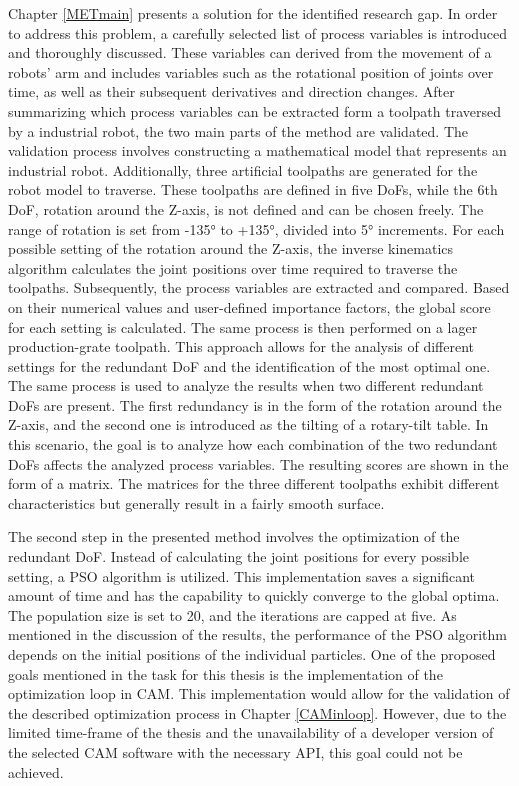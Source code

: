 Chapter \ref{METmain} presents a solution for the identified research gap. In order to address this problem, a carefully selected list of process variables is introduced and thoroughly discussed. These variables can derived from the movement of a robots' arm and includes variables such as the rotational position of joints over time, as well as their subsequent derivatives and direction changes.
After summarizing which process variables can be extracted form a toolpath traversed by a industrial robot, the two main parts of the method are validated. 
The validation process involves constructing a mathematical model that represents an industrial robot. Additionally, three artificial toolpaths are generated for the robot model to traverse. These toolpaths are defined in five \acrshort{DoF}s, while the 6th \acrshort{DoF}, rotation around the Z-axis, is not defined and can be chosen freely. The range of rotation is set from -135° to +135°, divided into 5° increments. For each possible setting of the rotation around the Z-axis, the inverse kinematics algorithm calculates the joint positions over time required to traverse the toolpaths. Subsequently, the process variables are extracted and compared. Based on their numerical values and user-defined importance factors, the global score for each setting is calculated. The same process is then performed on a lager production-grate toolpath. This approach allows for the analysis of different settings for the redundant \acrshort{DoF} and the identification of the most optimal one.
The same process is used to analyze the results when two different redundant \acrshort{DoF}s are present. The first redundancy is in the form of the rotation around the Z-axis, and the second one is introduced as the tilting of a rotary-tilt table. In this scenario, the goal is to analyze how each combination of the two redundant \acrshort{DoF}s affects the analyzed process variables. The resulting scores are shown in the form of a matrix. The matrices for the three different toolpaths exhibit different characteristics but generally result in a fairly smooth surface.

The second step in the presented method involves the optimization of the redundant \acrshort{DoF}. Instead of calculating the joint positions for every possible setting, a \acrshort{PSO} algorithm is utilized. This implementation saves a significant amount of time and has the capability to quickly converge to the global optima. The population size is set to 20, and the iterations are capped at five. As mentioned in the discussion of the results, the performance of the PSO algorithm depends on the initial positions of the individual particles. One of the proposed goals mentioned in the task for this thesis is the implementation of the optimization loop in \acrshort{CAM}. This implementation would allow for the validation of the described optimization process in Chapter \ref{CAMinloop}. However, due to the limited time-frame of the thesis and the unavailability of a developer version of the selected \acrshort{CAM} software with the necessary \acrshort{API}, this goal could not be achieved.


